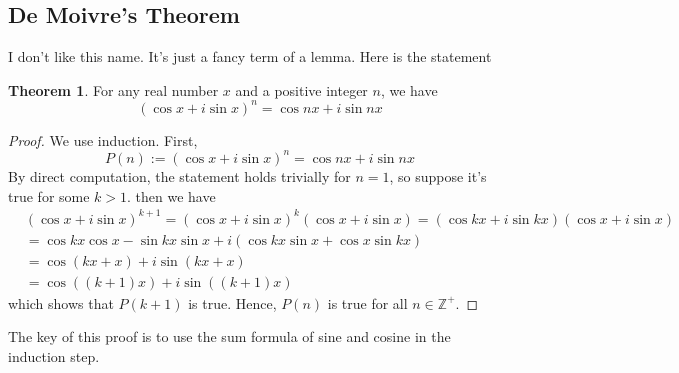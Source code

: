 \documentclass{article}
\theoremstyle{definition}
\theoremstyle{definition}
\theoremstyle{definition}
\theoremstyle{definition}
\theoremstyle{definition}
\theoremstyle{definition}
\theoremstyle{definition}
\theoremstyle{definition}
\theoremstyle{definition}
\newtheorem{theorem}{Theorem}[section]
\newcommand{\ZZ}{\mathbb{Z}}
\begin{document}
\subsection{De Moivre's Theorem}
I don't like this name. It's just a fancy term of a lemma. Here is the statement
\begin{theorem}
    For any real number $x$ and a positive integer $n$, we have \[(\cos x+i\sin x)^n=\cos nx+i\sin nx\]
\end{theorem}
\begin{proof}
    We use induction. First,
    \[
    P(n):= (\cos x+i\sin x)^n=\cos nx+i\sin nx 
    \]
    By direct computation, the statement holds trivially for $n=1$, so suppose it's true for some $k>1$.
    then we have
    \begin{align*}
        &(\cos x+i\sin x)^{k+1}=(\cos x+i\sin x)^k(\cos x+i\sin x)=(\cos kx+i\sin kx)(\cos x+i\sin x)\\
        &=\cos kx\cos x-\sin kx\sin x+i(\cos kx\sin x+\cos x\sin kx)\\
        &=\cos(kx+x)+i\sin(kx+x)\\
        &=\cos((k+1)x)+i\sin((k+1)x)
    \end{align*}
    which shows that $P(k+1)$ is true. Hence, $P(n)$ is true for all $n\in\ZZ^+$.
\end{proof}
The key of this proof is to use the sum formula of sine and cosine in the induction step.
\end{document}
